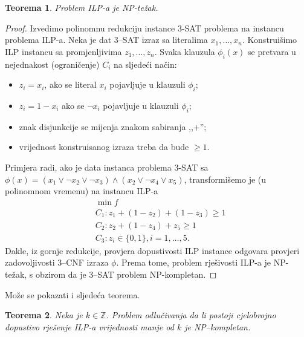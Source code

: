 \documentclass[b5paper, utf8, 11pt, colorlinks]{book}
\newtheorem{thm}{Teorema}[chapter]
\theoremstyle{definition}
\begin{document}
\begin{thm}
	Problem ILP-a je NP-težak.
\end{thm}
\begin{proof}
	Izvedimo polinomnu redukciju instance 3-SAT problema na instancu problema ILP-a. Neka je dat 3--SAT izraz sa literalima  
	$x_1,\ldots, x_n$.  Konstruišimo ILP instancu sa promjenljivima $z_1, \ldots, z_n$.
	Svaka klauzula $\phi_i(x)$ se pretvara u nejednakost (ograničenje)  $C_i$ na sljedeći način:
	\begin{itemize}
		\item $z_i = x_i$, ako se literal $x_i$ pojavljuje u klauzuli $\phi_i$; 
		\item $z_i = 1 - x_i$ ako se $\neg x_i$ pojavljuje u klauzuli $\phi_i$;
		\item znak disjunkcije se mijenja znakom sabiranja ,,+'';
		\item vrijednost konstruisanog izraza treba da bude $\geq 1$. 
	\end{itemize}
	Primjera radi, ako je data instanca problema 3-SAT sa 
	$\phi(x) = (x_1 \vee \neg x_2 \vee \neg x_3) \wedge ( x_2 \vee \neg x_4 \vee x_5 )$, transformišemo je (u polinomnom vremenu) na instancu ILP-a
	\begin{align*}
		& \min f \\
		&C_1: z_1 + (1- z_2) + (1 - z_3 ) \geq 1 \\
		& C_2: z_2 + (1-z_4)  + z_5 \geq 1 \\
		& C_3: z_i \in \{0,1\}, i=1,\ldots,5.
	\end{align*} 
	Dakle, iz gornje redukcije,  provjera dopustivosti ILP instance odgovara provjeri zadovoljivosti 3--CNF izraza $\phi$.   Prema tome, problem rješivosti ILP-a je NP-težak, s obzirom da je 3--SAT problem NP-kompletan. 
\end{proof} 
Može se pokazati i sljedeća teorema.
\begin{thm} Neka je $k\in \mathbb{Z}$.
	Problem odlučivanja da li postoji cjelobrojno dopustivo rješenje  ILP-a  vrijednosti manje od $k$ je NP--kompletan.
\end{thm}
\end{document}
